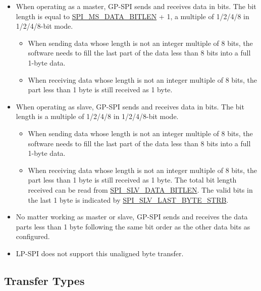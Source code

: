 \documentclass[main\_\_EN.tex]{subfiles}
\begin{document}
\begin{itemize}
    \item When operating as a master, GP-SPI sends and receives data in bits. The bit length is equal to \hyperref[fielddesc:SPIMSDATABITLEN]{SPI\_MS\_DATA\_BITLEN} + 1, a multiple of 1/2/4/8 in 1/2/4/8-bit mode.
    \begin{itemize}
        \item When sending data whose length is not an integer multiple of 8 bits, the software needs to fill the last part of the data less than 8 bits into a full 1-byte data.
        \item When receiving data whose length is not an integer multiple of 8 bits, the part less than 1 byte is still received as 1 byte.
    \end{itemize}


    \item When operating as slave, GP-SPI sends and receives data in bits. The bit length is a multiple of 1/2/4/8 in 1/2/4/8-bit mode.
    \begin{itemize}
        \item When sending data whose length is not an integer multiple of 8 bits, the software needs to fill the last part of the data less than 8 bits into a full 1-byte data.
        \item When receiving data whose length is not an integer multiple of 8 bits, the part less than 1 byte is still received as 1 byte. The total bit length received can be read from \hyperref[fielddesc:SPISLVDATABITLEN]{SPI\_SLV\_DATA\_BITLEN}. The valid bits in the last 1 byte is indicated by \hyperref[fielddesc:SPISLVLASTBYTESTRB]{SPI\_SLV\_LAST\_BYTE\_STRB}.
    \end{itemize}
\end{itemize}

\begin{tiplisting}
\vspace{-2em}
\begin{itemize}
\item No matter working as master or slave, GP-SPI sends and receives the data parts less than 1 byte following the same bit order as the other data bits as configured.
\item LP-SPI does not support this unaligned byte transfer.
\end{itemize}
\end{tiplisting}

\subsection{Transfer Types}
\end{document}
